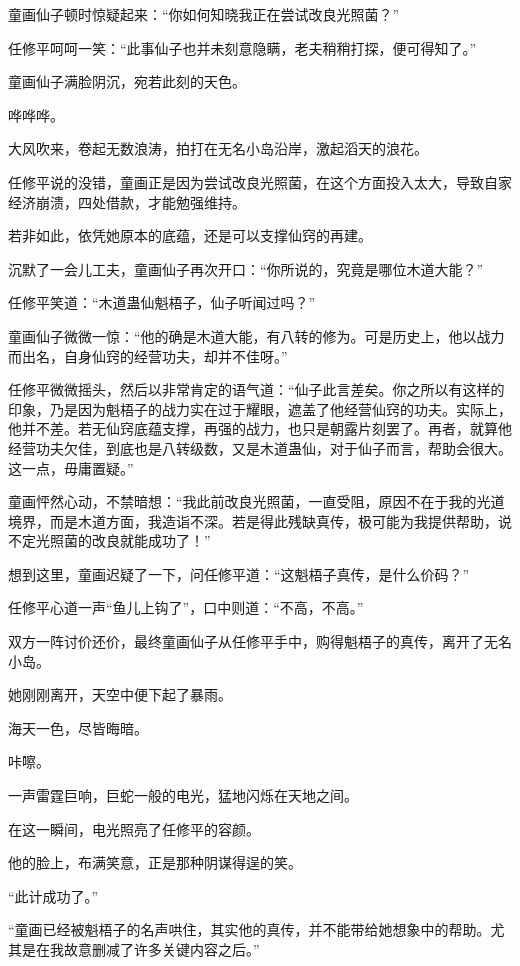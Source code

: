 \begin{this_body}
童画仙子顿时惊疑起来：“你如何知晓我正在尝试改良光照菌？”

任修平呵呵一笑：“此事仙子也并未刻意隐瞒，老夫稍稍打探，便可得知了。”

童画仙子满脸阴沉，宛若此刻的天色。

哗哗哗。

大风吹来，卷起无数浪涛，拍打在无名小岛沿岸，激起滔天的浪花。

任修平说的没错，童画正是因为尝试改良光照菌，在这个方面投入太大，导致自家经济崩溃，四处借款，才能勉强维持。

若非如此，依凭她原本的底蕴，还是可以支撑仙窍的再建。

沉默了一会儿工夫，童画仙子再次开口：“你所说的，究竟是哪位木道大能？”

任修平笑道：“木道蛊仙魁梧子，仙子听闻过吗？”

童画仙子微微一惊：“他的确是木道大能，有八转的修为。可是历史上，他以战力而出名，自身仙窍的经营功夫，却并不佳呀。”

任修平微微摇头，然后以非常肯定的语气道：“仙子此言差矣。你之所以有这样的印象，乃是因为魁梧子的战力实在过于耀眼，遮盖了他经营仙窍的功夫。实际上，他并不差。若无仙窍底蕴支撑，再强的战力，也只是朝露片刻罢了。再者，就算他经营功夫欠佳，到底也是八转级数，又是木道蛊仙，对于仙子而言，帮助会很大。这一点，毋庸置疑。”

童画怦然心动，不禁暗想：“我此前改良光照菌，一直受阻，原因不在于我的光道境界，而是木道方面，我造诣不深。若是得此残缺真传，极可能为我提供帮助，说不定光照菌的改良就能成功了！”

想到这里，童画迟疑了一下，问任修平道：“这魁梧子真传，是什么价码？”

任修平心道一声“鱼儿上钩了”，口中则道：“不高，不高。”

双方一阵讨价还价，最终童画仙子从任修平手中，购得魁梧子的真传，离开了无名小岛。

她刚刚离开，天空中便下起了暴雨。

海天一色，尽皆晦暗。

咔嚓。

一声雷霆巨响，巨蛇一般的电光，猛地闪烁在天地之间。

在这一瞬间，电光照亮了任修平的容颜。

他的脸上，布满笑意，正是那种阴谋得逞的笑。

“此计成功了。”

“童画已经被魁梧子的名声哄住，其实他的真传，并不能带给她想象中的帮助。尤其是在我故意删减了许多关键内容之后。”


\end{this_body}
